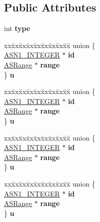 \subsection*{Public Attributes}
\begin{DoxyCompactItemize}
\item 
\mbox{\label{structASIdOrRange__st_a6abc25c7fdb4a6799aad3531067e9ec9}} 
int {\bfseries type}
\item 
\mbox{\label{structASIdOrRange__st_afc07224ab92a607897229dc60e921771}} 
\begin{tabbing}
xx\=xx\=xx\=xx\=xx\=xx\=xx\=xx\=xx\=\kill
union \{\\
\>\hyperlink{structasn1__string__st}{ASN1\_INTEGER} $\ast$ {\bfseries id}\\
\>\hyperlink{structASRange__st}{ASRange} $\ast$ {\bfseries range}\\
\} {\bfseries u}\\

\end{tabbing}\item 
\mbox{\label{structASIdOrRange__st_a3eb4f946a7796c386626c1bae51ea7b4}} 
\begin{tabbing}
xx\=xx\=xx\=xx\=xx\=xx\=xx\=xx\=xx\=\kill
union \{\\
\>\hyperlink{structasn1__string__st}{ASN1\_INTEGER} $\ast$ {\bfseries id}\\
\>\hyperlink{structASRange__st}{ASRange} $\ast$ {\bfseries range}\\
\} {\bfseries u}\\

\end{tabbing}\item 
\mbox{\label{structASIdOrRange__st_a0664e5576f7e1d2a59be0032793ee96b}} 
\begin{tabbing}
xx\=xx\=xx\=xx\=xx\=xx\=xx\=xx\=xx\=\kill
union \{\\
\>\hyperlink{structasn1__string__st}{ASN1\_INTEGER} $\ast$ {\bfseries id}\\
\>\hyperlink{structASRange__st}{ASRange} $\ast$ {\bfseries range}\\
\} {\bfseries u}\\

\end{tabbing}\item 
\mbox{\label{structASIdOrRange__st_abbbe21108bc49185217e0db4bb72db0b}} 
\begin{tabbing}
xx\=xx\=xx\=xx\=xx\=xx\=xx\=xx\=xx\=\kill
union \{\\
\>\hyperlink{structasn1__string__st}{ASN1\_INTEGER} $\ast$ {\bfseries id}\\
\>\hyperlink{structASRange__st}{ASRange} $\ast$ {\bfseries range}\\
\} {\bfseries u}\\


\end{tabbing}
\end{DoxyCompactItemize}
